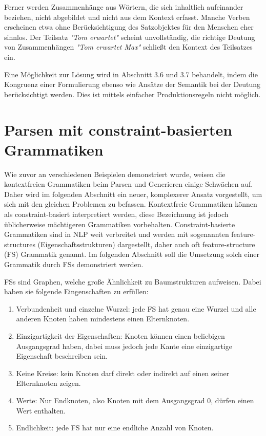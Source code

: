 \documentclass[12pt]{report}
\begin{document}
Ferner werden Zusammenhänge aus Wörtern, die sich inhaltlich aufeinander beziehen, nicht abgebildet und nicht aus dem Kontext erfasst. Manche Verben erscheinen etwa ohne Berücksichtigung des Satzobjektes für den Menschen eher sinnlos. Der Teilsatz \textit{"Tom erwartet"} scheint unvollständig, die richtige Deutung von Zusammenhängen \textit{"Tom erwartet Max"} schließt den Kontext des Teilsatzes ein.

Eine Möglichkeit zur Lösung wird in Abschnitt 3.6 und 3.7 behandelt, indem die Kongruenz einer Formulierung ebenso wie Ansätze der Semantik bei der Deutung berücksichtigt werden. Dies ist mittels einfacher Produktionsregeln nicht möglich.

\section{Parsen mit constraint-basierten Grammatiken}
Wie zuvor an verschiedenen Beispielen demonstriert wurde, weisen die kontextfreien Grammatiken beim Parsen und Generieren einige Schwächen auf. Daher wird im folgenden Abschnitt ein neuer, komplexerer Ansatz vorgestellt, um sich mit den gleichen Problemen zu befassen. Kontextfreie Grammatiken können als constraint-basiert interpretiert werden, diese Bezeichnung ist jedoch üblicherweise mächtigeren Grammatiken vorbehalten. Constraint-basierte Grammatiken sind in NLP weit verbreitet und werden mit sogenannten feature-structures (Eigenschaftsstrukturen) dargestellt, daher auch oft feature-structure (FS) Grammatik genannt. Im folgenden Abschnitt soll die Umsetzung solch einer Grammatik durch FSs demonstriert werden.

FSs sind Graphen, welche große Ähnlichkeit zu Baumstrukturen aufweisen. Dabei haben sie  folgende Eingenschaften zu erfüllen:

\begin{enumerate}
\item Verbundenheit und einzelne Wurzel: jede FS hat genau eine Wurzel und alle anderen Knoten haben mindestens einen Elternknoten.
\item Einzigartigkeit der Eigenschaften: Knoten können einen beliebigen Ausgangsgrad haben, dabei muss jedoch jede Kante eine einzigartige Eigenschaft beschreiben sein.
\item Keine Kreise: kein Knoten darf direkt oder indirekt auf einen seiner Elternknoten zeigen. 
\item Werte: Nur Endknoten, also Knoten mit dem Ausgangsgrad 0, dürfen einen Wert enthalten. 
\item Endlichkeit: jede FS hat nur eine endliche Anzahl von Knoten.
\end{enumerate}
\end{document}
